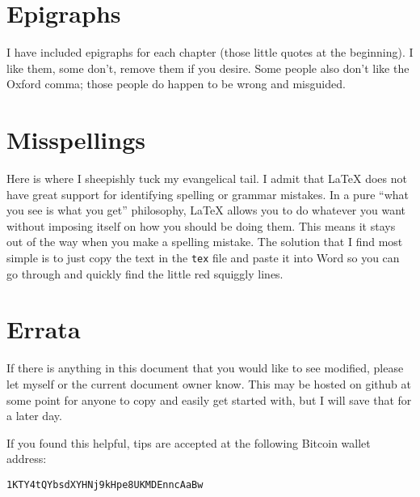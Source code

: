 \section{Epigraphs}

I have included epigraphs for each chapter (those little quotes at the beginning).
I like them, some don't, remove them if you desire. 
Some people also don't like the Oxford comma; those people do happen to be wrong and misguided.

\section{Misspellings}

Here is where I sheepishly tuck my evangelical tail.
I admit that LaTeX does not have great support for identifying spelling or grammar mistakes.
In a pure ``what you see is what you get'' philosophy, LaTeX allows you to do whatever you want without imposing itself on how you should be doing them. 
This means it stays out of the way when you make a spelling mistake.
The solution that I find most simple is to just copy the text in the \texttt{tex} file and paste it into Word so you can go through and quickly find the little red squiggly lines.


\section{Errata}

If there is anything in this document that you would like to see modified, please let myself or the current document owner know. 
This may be hosted on github at some point for anyone to copy and easily get started with, but I will save that for a later day.

If you found this helpful, tips are accepted at the following Bitcoin wallet address:

\center

\texttt{1KTY4tQYbsdXYHNj9kHpe8UKMDEnncAaBw}

\justify


